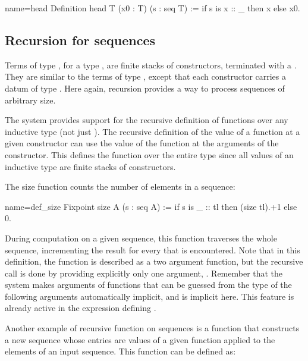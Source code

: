 \begin{coq}{name=head}{}
Definition head T (x0 : T) (s : seq T) := if s is x :: _ then x else x0.
\end{coq}

\subsection{Recursion for sequences}

Terms of type , for a type , are finite stacks of
 constructors, terminated with a . They are similar to
the terms of type , except that each  constructor
carries a datum of type . Here again, recursion provides a way
to process sequences of arbitrary size.


The \Coq{} system provides support for the recursive definition of
functions over any inductive type (not just ). The recursive
definition of the value of a
function at a given constructor can use the value of the function at
the arguments of the constructor. This defines the function over the
entire type since all values of an inductive type are finite stacks of
constructors.

The size function counts the number of elements in a sequence:

\begin{coq}{name=def_size}{}
Fixpoint size A (s : seq A) :=
  if s is _ :: tl then (size tl).+1 else 0.
\end{coq}
During computation on a given sequence, this function traverses
the whole sequence, incrementing the result for every
 that is encountered.  Note that in this
definition, the function  is described as a two argument
function, but the recursive call  is done by providing
explicitly only one argument, . Remember that
the \Coq{} system makes
arguments of functions that can be guessed from the type of the following
arguments automatically implicit, and  is implicit here. This
feature is already active in the expression defining .

Another example of recursive function on sequences is a function that constructs
a new sequence whose entries are values of a given function applied to
the elements of an input sequence.  This function can be defined as:

